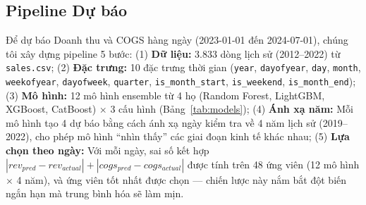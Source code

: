 \documentclass{article}
\begin{document}



\subsection{Pipeline Dự báo}

Để dự báo Doanh thu và COGS hàng ngày (2023-01-01 đến 2024-07-01), chúng tôi xây dựng pipeline 5 bước:
(1) \textbf{Dữ liệu:} 3.833 dòng lịch sử (2012--2022) từ \texttt{sales.csv};
(2) \textbf{Đặc trưng:} 10 đặc trưng thời gian (\texttt{year}, \texttt{dayofyear}, \texttt{day}, \texttt{month}, \texttt{weekofyear}, \texttt{dayofweek}, \texttt{quarter}, \texttt{is\_month\_start}, \texttt{is\_weekend}, \texttt{is\_month\_end});
(3) \textbf{Mô hình:} 12 mô hình ensemble từ 4 họ (Random Forest, LightGBM, XGBoost, CatBoost) $\times$ 3 cấu hình (Bảng~\ref{tab:models});
(4) \textbf{Ánh xạ năm:} Mỗi mô hình tạo 4 dự báo bằng cách ánh xạ ngày kiểm tra về 4 năm lịch sử (2019--2022), cho phép mô hình ``nhìn thấy'' các giai đoạn kinh tế khác nhau;
(5) \textbf{Lựa chọn theo ngày:} Với mỗi ngày, sai số kết hợp $|rev_{pred} - rev_{actual}| + |cogs_{pred} - cogs_{actual}|$ được tính trên 48 ứng viên (12 mô hình $\times$ 4 năm), và ứng viên tốt nhất được chọn — chiến lược này nắm bắt đột biến ngắn hạn mà trung bình hóa sẽ làm mịn.
\end{document}
